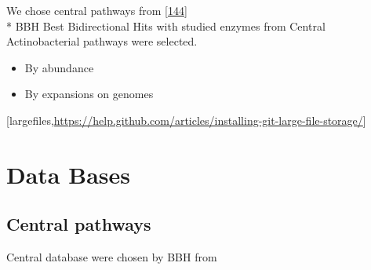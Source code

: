 \documentclass[12pt,twoside]{reedthesis}
\begin{document}
  We chose central pathways from
  {[}\protect\hyperlink{ref-barona-gomez_what_2012}{144}{]}\\
  * BBH Best Bidirectional Hits with studied enzymes from Central
  Actinobacterial pathways were selected.
  
  \begin{itemize}
  \item
    By abundance
  \item
    By expansions on genomes
  \end{itemize}
  
  {[}largefiles,\url{https://help.github.com/articles/installing-git-large-file-storage/}{]}
  
  \section{Data Bases}\label{data-bases}
  
  \subsection{Central pathways}\label{central-pathways}
  
  Central database were chosen by BBH from
  
  \begin{Shaded}
  \begin{Highlighting}[]
  \StringTok{ }\NormalTok{(}\NormalTok{, } \NormalTok{,}\NormalTok{)}
   \CharTok{\textbackslash{}\textbackslash{}}\NormalTok{,} \NormalTok{)}
  \end{Highlighting}
  \end{Shaded}
  
\end{document}
